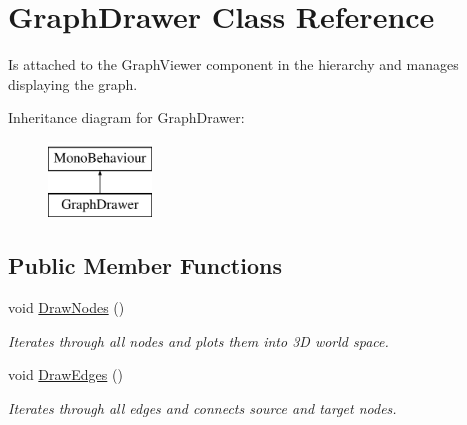 \hypertarget{class_graph_drawer}{}\section{Graph\+Drawer Class Reference}
\label{class_graph_drawer}


Is attached to the Graph\+Viewer component in the hierarchy and manages displaying the graph.  


Inheritance diagram for Graph\+Drawer\+:\begin{figure}[H]
\begin{center}
\leavevmode
\includegraphics[height=2.000000cm]{class_graph_drawer}
\end{center}
\end{figure}
\subsection*{Public Member Functions}
\begin{DoxyCompactItemize}
\item 
void \mbox{\hyperlink{class_graph_drawer_a3aabb356d594c77af566191bc7869eff}{Draw\+Nodes}} ()
\begin{DoxyCompactList}\small\item\em Iterates through all nodes and plots them into 3D world space. \end{DoxyCompactList}\item 
void \mbox{\hyperlink{class_graph_drawer_ad4bde4b9d817629c77bc1e8818e5cd69}{Draw\+Edges}} ()
\begin{DoxyCompactList}\small\item\em Iterates through all edges and connects source and target nodes. \end{DoxyCompactList}\end{DoxyCompactItemize}
